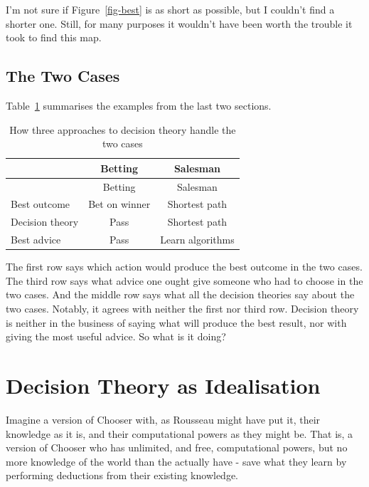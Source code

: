 \documentclass[
  10pt,
  letterpaper,
  DIV=11,
  numbers=noendperiod,
  twoside]{scrartcl}
\begin{document}
I'm not sure if Figure~\ref{fig-best} is as short as possible, but I
couldn't find a shorter one. Still, for many purposes it wouldn't have
been worth the trouble it took to find this map.

\subsection{The Two Cases}\label{the-two-cases}

Table~\ref{tbl-examples} summarises the examples from the last two
sections.

\begin{longtable}[]{@{}lcc@{}}
\caption{How three approaches to decision theory handle the two
cases}\label{tbl-examples}\tabularnewline
\toprule\noalign{}
& Betting & Salesman \\
\midrule\noalign{}
\endfirsthead
\toprule\noalign{}
& Betting & Salesman \\
\midrule\noalign{}
\endhead
\bottomrule\noalign{}
\endlastfoot
Best outcome & Bet on winner & Shortest path \\
Decision theory & Pass & Shortest path \\
Best advice & Pass & Learn algorithms \\
\end{longtable}

The first row says which action would produce the best outcome in the
two cases. The third row says what advice one ought give someone who had
to choose in the two cases. And the middle row says what all the
decision theories say about the two cases. Notably, it agrees with
neither the first nor third row. Decision theory is neither in the
business of saying what will produce the best result, nor with giving
the most useful advice. So what is it doing?

\section{Decision Theory as
Idealisation}\label{decision-theory-as-idealisation}

Imagine a version of Chooser with, as Rousseau might have put it, their
knowledge as it is, and their computational powers as they might be.
That is, a version of Chooser who has unlimited, and free, computational
powers, but no more knowledge of the world than the actually have - save
what they learn by performing deductions from their existing knowledge.
\end{document}
